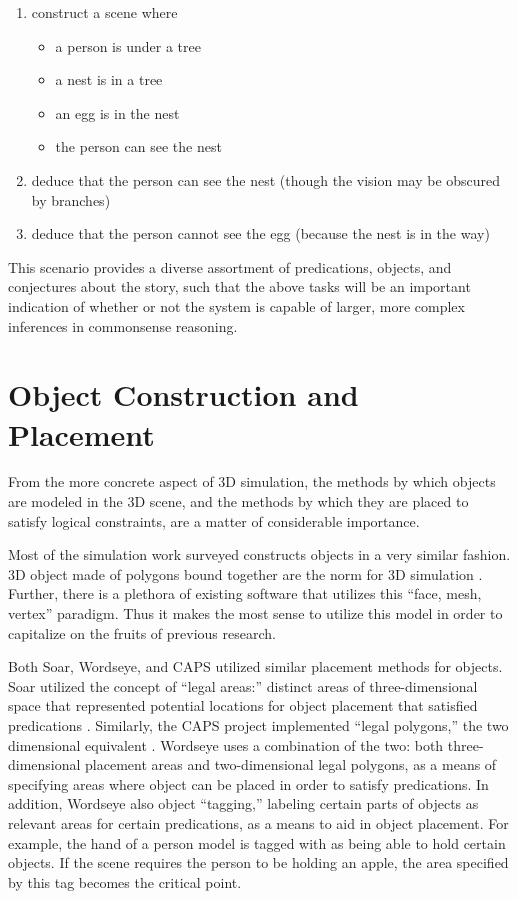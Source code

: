 \begin{center}
	\begin{enumerate}
		\item construct a scene where
		\begin{itemize}
			\item a person is under a tree
			\item a nest is in a tree
			\item an egg is in the nest
			\item the person can see the nest
		\end{itemize}
		\item deduce that the person can see the nest (though the vision may be obscured by branches)
		\item deduce that the person cannot see the egg (because the nest is in the way)
	\end{enumerate}
\end{center}

This scenario provides a diverse assortment of predications, objects, and conjectures about the story, such that the above tasks will be an important indication of whether or not the system is capable of larger, more complex inferences in commonsense reasoning.

\section{Object Construction and Placement}
From the more concrete aspect of 3D simulation, the methods by which objects are modeled in the 3D scene, and the methods by which they are placed to satisfy logical constraints, are a matter of considerable importance.

Most of the simulation work surveyed constructs objects in a very similar fashion. 3D object made of polygons bound together are the norm for 3D simulation \cite{xu2002constraint,wintermute2009overview,wordseye}. Further, there is a plethora of existing software that utilizes this ``face, mesh, vertex'' paradigm. Thus it makes the most sense to utilize this model in order to capitalize on the fruits of previous research.

Both Soar, Wordseye, and CAPS utilized similar placement methods for objects. Soar utilized the concept of ``legal areas:'' distinct areas of three-dimensional space that represented potential locations for object placement that satisfied predications \cite{wintermute2009overview}. Similarly, the CAPS project implemented ``legal polygons,'' the two dimensional equivalent \cite{xu2002constraint}. Wordseye uses a combination of the two: both three-dimensional placement areas and two-dimensional legal polygons, as a means of specifying areas where object can be placed in order to satisfy predications. In addition, Wordseye also object ``tagging,'' labeling certain parts of objects as relevant areas for certain predications, as a means to aid in object placement. For example, the hand of a person model is tagged with as being able to hold certain objects. If the scene requires the person to be holding an apple, the area specified by this tag becomes the critical point.